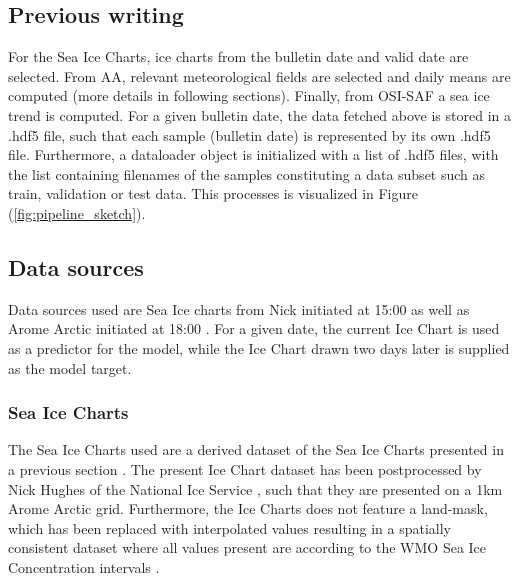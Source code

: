 \documentclass[../main/thesis]{subfiles}
\begin{document}



\subsection{Previous writing}

For the Sea Ice Charts, ice charts from the bulletin date and valid date are selected. From AA, relevant meteorological fields are selected and daily means are computed (more details in following sections). Finally, from OSI-SAF a sea ice trend is computed. For a given bulletin date, the data fetched above is stored in a .hdf5 file, such that each sample (bulletin date) is represented by its own .hdf5 file. Furthermore, a dataloader object is initialized with a list of .hdf5 files, with the list containing filenames of the samples constituting a data subset such as train, validation or test data. This processes is visualized in Figure (\ref{fig:pipeline_sketch}).


\subsection{Data sources}
Data sources used are Sea Ice charts from Nick initiated at 15:00 as well as Arome Arctic initiated at 18:00 \cite{Dinessen2020,Mueller2017}. For a given date, the current Ice Chart is used as a predictor for the model, while the Ice Chart drawn two days later is supplied as the model target.

\subsubsection{Sea Ice Charts}
The Sea Ice Charts used are a derived dataset of the Sea Ice Charts presented in a previous section . The present Ice Chart dataset has been postprocessed by Nick Hughes of the National Ice Service , such that they are presented on a 1km Arome Arctic grid. Furthermore, the Ice Charts does not feature a land-mask, which has been replaced with interpolated values resulting in a spatially consistent dataset where all values present are according to the WMO Sea Ice Concentration intervals \cite{JETSI2014}. 
\end{document}

